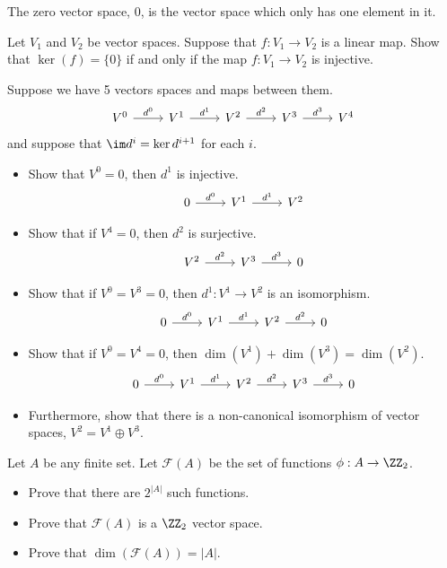 
The zero vector space, $0$, is the vector space which only has one element in it. 
\begin{exercise}
	Let $V_1$ and $V_2$ be vector spaces.
	Suppose that $f: V_1\to V_2$ is a linear map. 
	Show that $\ker(f)=\{0\}$ if and only if the map $f: V_1\to V_2$ is injective.
\end{exercise}

\begin{exercise}Suppose we have 5 vectors spaces and maps between them. 
	\[
		\begin{tikzcd}
			V^0\arrow{r}{d^0} & V^1 \arrow{r}{d^1} & V^2\arrow{r}{d^2} & V^3 \arrow{r}{d^3} & V^4
		\end{tikzcd}
	\]
	and suppose that $\im d^i=\ker d^{i+1}$ for each $i$. 
	\begin{itemize}
		\item Show that $V^0=0$, then $d^1$ is injective. 
		\[\begin{tikzcd}
			0 \arrow{r}{d^0} & V^1 \arrow{r}{d^1} & V^2
		\end{tikzcd}
		\]
		\item Show that if $V^4=0$, then $d^2$ is surjective.
		\[\begin{tikzcd}
			V^2\arrow{r}{d^2} & V^3 \arrow{r}{d^3} & 0
		\end{tikzcd}
		\]
		\item Show that if $V^0=V^3=0$, then $d^1:V^1\to V^2$ is an isomorphism. 
		\[\begin{tikzcd}
			0\arrow{r}{d^0} & V^1 \arrow{r}{d^1} & V^2\arrow{r}{d^2} & 0
		\end{tikzcd}
		\]
		\item Show that if $V^0=V^4=0$, then $\dim(V^1)+\dim(V^3)=\dim(V^2)$. 
		\[
			\begin{tikzcd}
				0\arrow{r}{d^0} & V^1 \arrow{r}{d^1} & V^2\arrow{r}{d^2} & V^3 \arrow{r}{d^3} & 0
			\end{tikzcd}
		\]
		\item Furthermore, show that there is a non-canonical isomorphism of vector spaces, $V^2=V^1\oplus V^3$.
	\end{itemize}
	\end{exercise}
\begin{exercise}
	Let $A$ be any finite set. Let $\mathcal F(A)$ be the set of functions $\phi: A\to \ZZ_2$. 
	\begin{itemize}
		\item Prove that there are $2^{|A|}$ such functions. 
		\item Prove that $\mathcal F(A)$ is a $\ZZ_2$ vector space. 
		\item Prove that $\dim(\mathcal F(A))=|A|$. 
	\end{itemize}
\end{exercise}
